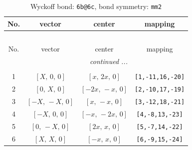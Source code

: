 \documentclass[fleqn,8pt]{jsarticle}
\begin{document}
\renewcommand{\arraystretch}{1.2}
\begin{longtable}{cccc}
\caption{Wyckoff bond: {\tt 6b@6c}, bond symmetry: {\tt mm2}}
 \\
 \hline \hline
No. & vector & center & mapping \\ \hline \endfirsthead

\multicolumn{3}{l}{\tablename\ \thetable{}} \\
 \hline \hline
No. & vector & center & mapping \\ \hline \endhead

 \hline \hline
\multicolumn{3}{r}{\footnotesize\it continued ...} \\ \endfoot

 \hline \hline
\multicolumn{3}{r}{} \\ \endlastfoot

1 & $\left[ X,\, 0,\, 0 \right]$ & $\left[ x,\, 2 x,\, 0 \right]$ & {\tt [1,-11,16,-20]} \\ \hline
2 & $\left[ 0,\, X,\, 0 \right]$ & $\left[ - 2 x,\, - x,\, 0 \right]$ & {\tt [2,-10,17,-19]} \\ \hline
3 & $\left[ - X,\, - X,\, 0 \right]$ & $\left[ x,\, - x,\, 0 \right]$ & {\tt [3,-12,18,-21]} \\ \hline
4 & $\left[ - X,\, 0,\, 0 \right]$ & $\left[ - x,\, - 2 x,\, 0 \right]$ & {\tt [4,-8,13,-23]} \\ \hline
5 & $\left[ 0,\, - X,\, 0 \right]$ & $\left[ 2 x,\, x,\, 0 \right]$ & {\tt [5,-7,14,-22]} \\ \hline
6 & $\left[ X,\, X,\, 0 \right]$ & $\left[ - x,\, x,\, 0 \right]$ & {\tt [6,-9,15,-24]} \\
\end{longtable}
\renewcommand{\arraystretch}{1.2}
\end{document}
